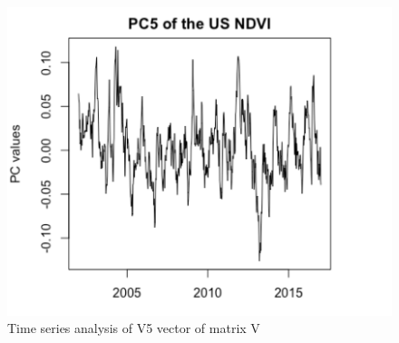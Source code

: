      \begin{figure}[H]
            \centering
            \includegraphics[width=0.70\linewidth]{figures/ch5/SVD/pc5.png}
            \caption{\label{fig:V_5} Time series analysis of V5 vector of matrix V}
    \end{figure}